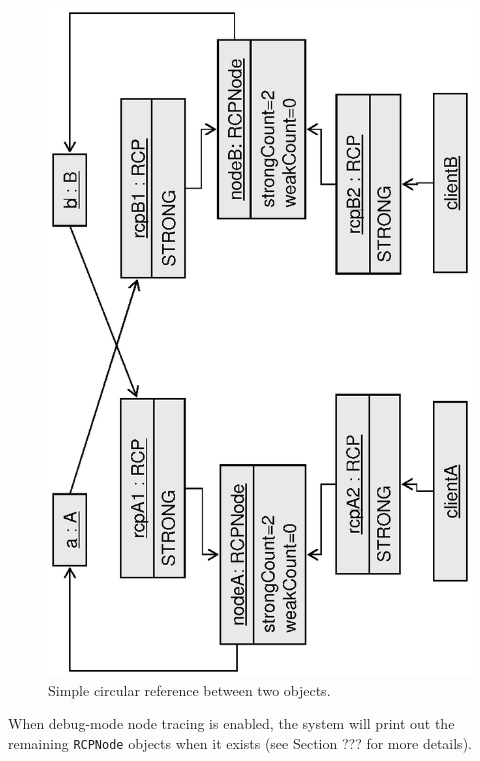 \documentclass[pdf,ps2pdf,11pt]{SANDreport}
\begin{document}
{\bsinglespace
\begin{figure}
\begin{center}
\includegraphics*[angle=270,scale=0.65]{CircularRCP_A_B}
\end{center}
\caption{
\label{fig:CircularRCP_A_B}
Simple circular reference between two objects.  }
\end{figure}
\esinglespace}

When debug-mode node tracing is enabled, the system will print out the
remaining {}\texttt{RCPNode} objects when it exists (see Section ??? 
for more details).
\end{document}

